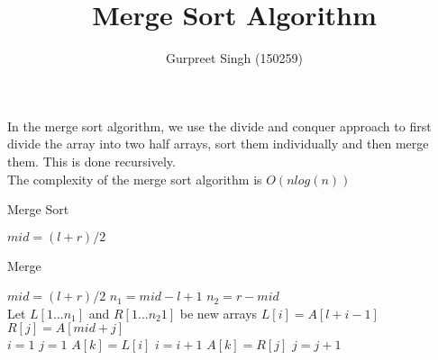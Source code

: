 \documentclass[a4paper]{article}
\title{Merge Sort Algorithm}
\author{Gurpreet Singh (150259)}
\date{}
\begin{document}
\maketitle

    In the merge sort algorithm, we use the divide and conquer approach to first divide the array into two half arrays, sort them individually and then merge them. This is done recursively.\\ The complexity of the merge sort algorithm is $O(nlog(n))$
    
    \begin{algorithm}
      	\caption{Merge Sort}
        \begin{algorithmic}[1]
            
                
                    \State $mid = (l + r) / 2$
                    \\
                    \State {} 
                    \State {} 
                    \State {} 
                
                \EndIf
            
            \EndProcedure
        \end{algorithmic}
    \end{algorithm}
	        
	\begin{algorithm}
      	\caption{Merge}
      	\begin{algorithmic}[2]
      		
	      		\State $mid = (l + r)/2$
	      		\State ${n_1} = mid - l + 1$
	      		\State ${n_2} = r - mid$
	      		\\
	      		\State Let $L[1 \ldots {n_1}]$ and $R[1 \ldots {n_2}1]$ be new arrays
	      		 
    	      		\State $L[i] = A[l + i - 1]$
	      		\EndFor
	      		 
    	      		\State $R[j] = A[mid + j]$
	      		\EndFor
	      		\\
	      		\State $i = 1$
	      		\State $j = 1$
	      		 
    	      		 
    	      		    \State $A[k] = L[i]$
    	      		    \State $i = i + 1$
    	      		\Else {}
    	      		    \State $A[k] = R[j]$
    	      		    \State $j = j + 1$
    	      		\EndIf
	      		\EndFor
      		\EndFunction
      		
      	\end{algorithmic}
      \end{algorithm}
\end{document}
